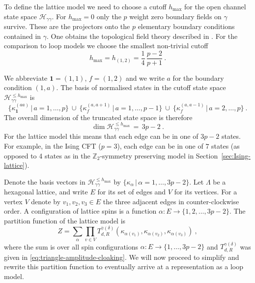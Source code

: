 \documentclass[11pt,a4paper]{article}
\numberwithin{equation}{section}
\newcommand{\one}{\mathbf{1}} %
\begin{document}
To define the lattice model we need to choose a cutoff $h_\mathrm{max}$ for the open channel state space $\mathcal{H}_{\gamma\gamma}$. 
For $h_\mathrm{max} = 0$ only the $p$ weight zero boundary fields on $\gamma$ survive. These are the projectors onto the $p$ elementary boundary conditions contained in $\gamma$. One obtains the topological field theory described in \cite[Sec.\,3]{Brehm:2021wev}. For the comparison to loop models we choose the smallest non-trivial cutoff
\begin{equation}
    h_\mathrm{max} = h_{(1,2)} = \frac14\,\frac{p-2}{p+1} \ .
\end{equation}

We abbreviate $\one = (1,1)$, $f = (1,2)$ and we write $a$ for the boundary condition $(1,a)$. The basis of normalised states in the cutoff state space $\mathcal{H}_{\gamma\gamma}^{\le h_\mathrm{max}}$ is
\begin{equation}\label{eq:minimal-nontrivial-basis}
\big\{  \kappa_{\one}^{(aa)} \,\big|\, a=1,\dots,p \big\}
    ~\cup~
\big\{  \kappa_{f}^{(a,a+1)} \,\big|\, a=1,\dots,p-1 \big\}
    ~\cup~
\big\{  \kappa_{f}^{(a,a-1)} \,\big|\, a=2,\dots,p \big\} \ .
\end{equation}
The overall dimension of the truncated state space is therefore 
\begin{equation}
    \dim \mathcal{H}_{\gamma\gamma}^{\le h_\mathrm{max}} \,=\, 3p-2 \ .
\end{equation}
For the lattice model this means that each edge can be in one of $3p-2$ states. For example, in the Ising CFT ($p=3$), each edge can be in one of $7$ states (as opposed to 4 states as in the $\mathbb{Z}_2$-symmetry preserving model in Section~\ref{sec:Ising-lattice}).

Denote the basis vectors in $\mathcal{H}_{\gamma\gamma}^{\le h_\mathrm{max}}$ by $\{\kappa_\alpha \,|\, \alpha = 1,\dots,3p-2 \}$. Let $\Lambda$ be a hexagonal lattice, and write $E$ for its set of edges and $V$ for its vertices. For a vertex $V$ denote by $v_1,v_2,v_3 \in E$ the three adjacent edges in counter-clockwise order. 
A configuration of lattice spins is a function $\alpha : E \to \{1,2,\dots,3p-2\}$. 
The partition function of the lattice model is
\begin{equation}\label{eq:original-partition-function}
    Z = \sum_{\alpha} \prod_{v \in V} T_{d,R}^{\gamma(\delta)}(\kappa_{\alpha(v_1)},\kappa_{\alpha(v_2)},\kappa_{\alpha(v_3)}) ~,
\end{equation}
where the sum is over all spin configurations $\alpha : E \to \{1,\dots,3p-2\}$ and $T_{d,R}^{\gamma(\delta)}$ was given in \eqref{eq:triangle-amplitude-cloaking}.
We will now proceed to simplify and rewrite this partition function to eventually arrive at a representation as a loop model.
\end{document}

